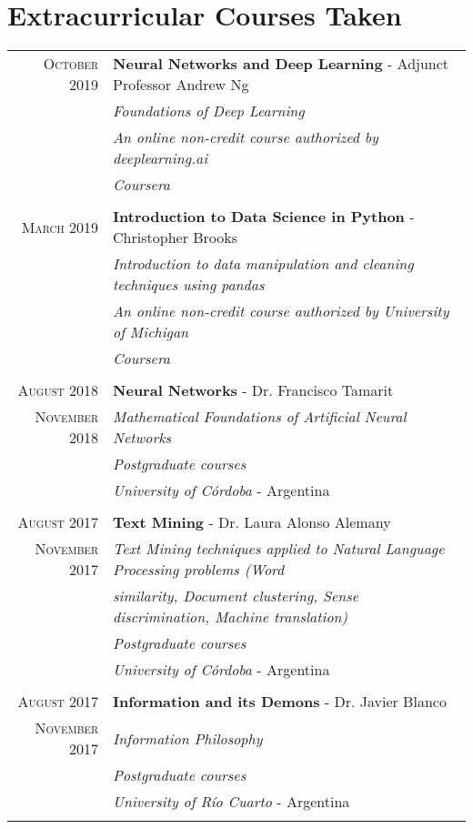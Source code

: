 \documentclass[a4paper,10pt]{article} %
\begin{document}
\section{Extracurricular Courses Taken}
\begin{longtable}{rl}
\textsc{October} 2019 & \textbf{Neural Networks and Deep Learning} - Adjunct Professor Andrew Ng \\
& \textit{Foundations of Deep Learning}  \\
& \textit{An online non-credit course authorized by deeplearning.ai} \\
& \textit{Coursera} \\ & \\

\textsc{March} 2019 & \textbf{Introduction to Data Science in Python} - Christopher Brooks \\
& \textit{Introduction to data manipulation and cleaning techniques using pandas}  \\
& \textit{An online non-credit course authorized by University of Michigan} \\
& \textit{Coursera} \\ & \\

\textsc{August} 2018 & \textbf{Neural Networks} - Dr. Francisco Tamarit \\
\textsc{November} 2018 & \textit{Mathematical Foundations of Artificial Neural Networks}  \\ 
& \textit{Postgraduate courses} \\
& \textit{University of Córdoba} - Argentina \\ & \\

\textsc{August} 2017 & \textbf{Text Mining} - Dr. Laura Alonso Alemany \\
\textsc{November} 2017 & \textit{Text Mining techniques applied to Natural Language Processing problems (Word}  \\ 
& \textit{similarity, Document clustering, Sense discrimination, Machine translation)} \\
& \textit{Postgraduate courses} \\
& \textit{University of Córdoba} - Argentina \\ & \\

\textsc{August} 2017 & \textbf{Information and its Demons} - Dr. Javier Blanco \\
\textsc{November} 2017 & \textit{Information Philosophy} \\
& \textit{Postgraduate courses} \\
& \textit{University of Río Cuarto} - Argentina \\ & \\


\end{longtable}
\end{document}

